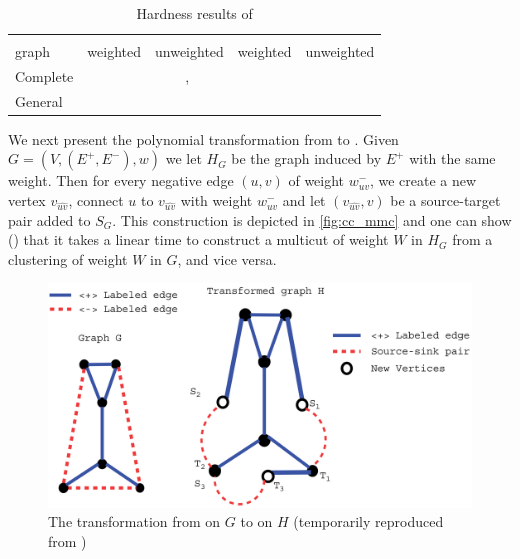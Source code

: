 \begin{table}[b]
   \centering
   \small
   \caption{Hardness results of \pcc{}} \label{tab:cc_cpx}
   \begin{tabulary}{187mm}{lCCCC}
      \toprule
               &    &                                    \\
      \cmidrule(r){2-3}
      \cmidrule(r){4-5}
      graph    & weighted                      & unweighted                                                     & weighted                                                     & unweighted                   \\
      \midrule
      Complete & \APXh{}~\autocite{Charikar2003} & \NPc{}~\autocite{Bansal2002}, \APXh{}~\autocite{Charikar2003}  &                                                              & \NPc{}~\autocite{Bansal2002} \\
      General  & \APXh{}~\autocites{Charikar2003}{Demaine2003} &  \APXh{}~\autocites{Charikar2003}{Emanuel2003}   &  \\
      \bottomrule
   \end{tabulary}
\end{table}

We next present the polynomial transformation from \pcc{} to \mmc{}. Given $G=(V, (E^+, E^-), w)$ we let
$H_G$ be the graph induced by $E^+$ with the same weight. Then for every negative edge $(u,v)$ of
weight $w_{uv}^-$, we create a new vertex $v_{\widehat{uv}}$, connect $u$ to $v_{\widehat{uv}}$ with
weight $w_{uv}^-$ and let $(v_{\widehat{uv}}, v)$ be a source-target pair added to $S_G$. This
construction is depicted in \autoref{fig:cc_mmc} and one can show (\autocite[Theorem
4.4]{Demaine2006}) that it takes a linear time to construct a
multicut of weight $W$ in $H_G$ from a clustering of weight $W$ in $G$, and vice versa.

\begin{figure}[htpb]
   \centering
   \includegraphics[width=0.8\linewidth]{assets/raw/cc_to_mmc.png}
   \caption{The transformation from \pcc{} on $G$ to \mmc{} on $H$ (temporarily reproduced from
   \autocite{Demaine2006}) \label{fig:cc_mmc}}
\end{figure}

